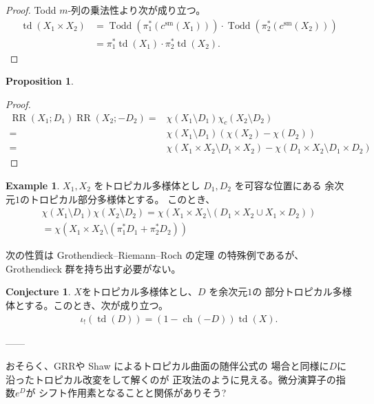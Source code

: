 \documentclass[a4paper,dvipdfmx,reqno,12pt]{amsart}
\theoremstyle{definition}
\newtheorem{example}[theorem]{Example}
\newtheorem{proposition}[theorem]{Proposition}
\newtheorem{conjecture}[theorem]{Conjecture}
\newcommand{\opn}[1]{\operatorname{#1}}
\numberwithin{equation}{section}
\begin{document}
\begin{proof}
Todd $m$-列の乗法性より次が成り立つ。
\begin{align}
\opn{td}(X_1\times X_2)
&=\opn{Todd}(\pi^{*}_1(c^{\mathrm{sm}}(X_1)))
\cdot \opn{Todd}(\pi^{*}_2(c^{\mathrm{sm}}(X_2))) \\
&=\pi^{*}_1\opn{td}(X_1)\cdot 
\pi^{*}_2\opn{td}(X_2).
\end{align}

\end{proof}

\begin{proposition}

\end{proposition}
\begin{proof}

\begin{align}
\opn{RR}(X_1;D_1)
\opn{RR}(X_2;-D_2)
= &\chi(X_1\setminus D_1)\chi_c(X_2\setminus D_2) \\
= &\chi(X_1\setminus D_1)
(\chi(X_2)-\chi(D_2)) \\
= &\chi(X_1\times X_2\setminus D_1\times X_2)
-\chi(D_1\times X_2\setminus D_1\times D_2)
\end{align}

\end{proof}




\begin{example}
$X_1,X_2$ をトロピカル多様体とし 
$D_1,D_2$ を可容な位置にある
余次元$1$のトロピカル部分多様体とする。
このとき、
\begin{align}
\chi(X_1\setminus D_1)\chi(X_2\setminus D_2)
=\chi(X_1\times X_2 \setminus (D_1\times X_2\cup X_1\times D_2)) \\
=\chi(X_1\times X_2 \setminus (\pi_1^{*}D_1+\pi_2^{*}D_2))
\end{align}

\end{example}

次の性質は Grothendieck--Riemann--Roch の定理
の特殊例であるが、 Grothendieck 群を持ち出す必要がない。
\begin{conjecture}
\label{conjecture-grr-divisor}
$X$をトロピカル多様体とし、$D$ を余次元$1$の
部分トロピカル多様体とする。このとき、次が成り立つ。
\begin{align}
\iota_!(\opn{td}(D))=(1-\opn{ch}(-D))\opn{td}(X).
\end{align}
\end{conjecture}
------

おそらく、GRRや Shaw によるトロピカル曲面の随伴公式の
場合と同様に$D$に沿ったトロピカル改変をして解くのが
正攻法のように見える。微分演算子の指数$e^D$が
シフト作用素となることと関係がありそう?
\end{document}
